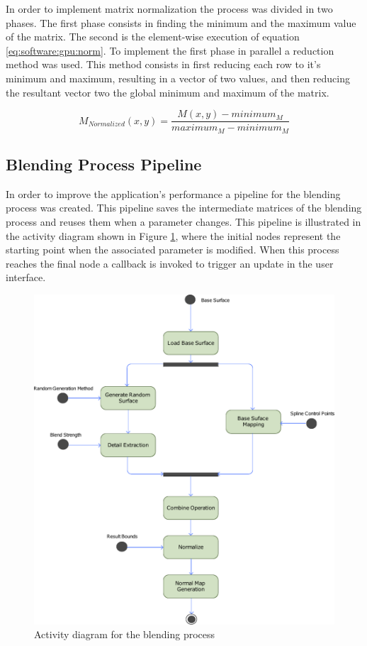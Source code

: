 	    In order to implement matrix normalization the process was divided in two phases. The first phase consists in finding the minimum and the maximum value of the matrix. The second is the element-wise execution of equation \ref{eq:software:gpu:norm}. To implement the first phase in parallel a reduction method was used. This method consists in first reducing each row to it's minimum and maximum, resulting in a vector of two values, and then reducing the resultant vector two the global minimum and maximum of the matrix.
	    
	    \begin{equation} \label{eq:software:gpu:norm}
		  M_{Normalized}(x, y) = \frac{M(x, y) - minimum_M}{maximum_M - minimum_M}
	    \end{equation}
	    
    \subsection {Blending Process Pipeline} %
      
      In order to improve the application's performance a pipeline for the blending process was created. This pipeline saves the intermediate matrices of the blending process and reuses them when a parameter changes. This pipeline is illustrated in the activity diagram shown in Figure \ref{fig:activity_blending_process}, where the initial nodes represent the starting point when the associated parameter is modified. When this process reaches the final node a callback is invoked to trigger an update in the user interface.
      
      \begin{figure}[H]
      	\begin{center}
      	  \includegraphics[width=\textwidth]{images/diagrams/blending_process.pdf}
      	\end{center}
        \caption{Activity diagram for the blending process}
        \label{fig:activity_blending_process}
      \end{figure} 